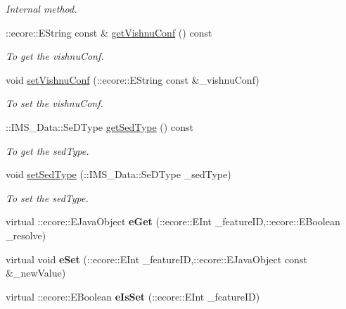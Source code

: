 \begin{DoxyCompactItemize}
\begin{DoxyCompactList}\small\item\em Internal method. \item\end{DoxyCompactList}\item 
::ecore::EString const \& \hyperlink{classIMS__Data_1_1RestartOp_a75f45f7a01df60e12573b32d58dfd303}{getVishnuConf} () const 
\begin{DoxyCompactList}\small\item\em To get the vishnuConf. \item\end{DoxyCompactList}\item 
void \hyperlink{classIMS__Data_1_1RestartOp_a797abd8014b59aa6947340d7e859a722}{setVishnuConf} (::ecore::EString const \&\_\-vishnuConf)
\begin{DoxyCompactList}\small\item\em To set the vishnuConf. \item\end{DoxyCompactList}\item 
::IMS\_\-Data::SeDType \hyperlink{classIMS__Data_1_1RestartOp_a28d7a15d84bd14336da8ac4be5acad8f}{getSedType} () const 
\begin{DoxyCompactList}\small\item\em To get the sedType. \item\end{DoxyCompactList}\item 
void \hyperlink{classIMS__Data_1_1RestartOp_a98616a772938d5176fc06cfba5f48f04}{setSedType} (::IMS\_\-Data::SeDType \_\-sedType)
\begin{DoxyCompactList}\small\item\em To set the sedType. \item\end{DoxyCompactList}\item 
\hypertarget{classIMS__Data_1_1RestartOp_a40b4a8a3d0c7fdc133af2f65b2c56567}{
virtual ::ecore::EJavaObject {\bfseries eGet} (::ecore::EInt \_\-featureID,::ecore::EBoolean \_\-resolve)}
\label{classIMS__Data_1_1RestartOp_a40b4a8a3d0c7fdc133af2f65b2c56567}

\item 
\hypertarget{classIMS__Data_1_1RestartOp_a8f72cffb176f270699bae22b5e664143}{
virtual void {\bfseries eSet} (::ecore::EInt \_\-featureID,::ecore::EJavaObject const \&\_\-newValue)}
\label{classIMS__Data_1_1RestartOp_a8f72cffb176f270699bae22b5e664143}

\item 
\hypertarget{classIMS__Data_1_1RestartOp_a29156286e05c346a89475e0eb69035db}{
virtual ::ecore::EBoolean {\bfseries eIsSet} (::ecore::EInt \_\-featureID)}
\label{classIMS__Data_1_1RestartOp_a29156286e05c346a89475e0eb69035db}


\end{DoxyCompactItemize}
